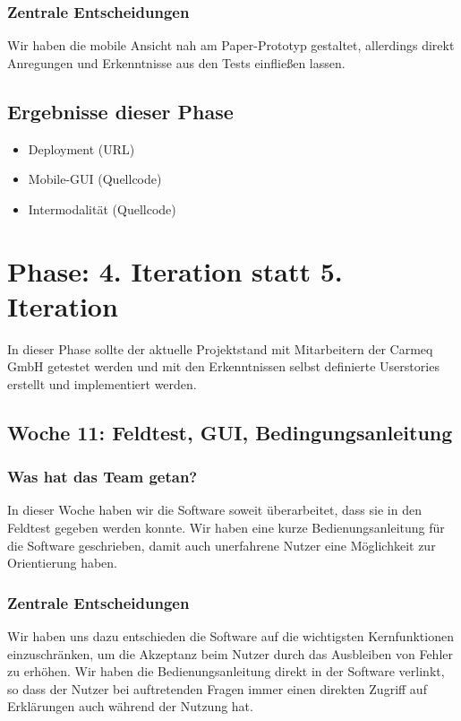 \documentclass{article}
\begin{document}
\subsubsection{Zentrale Entscheidungen}

Wir haben die mobile Ansicht nah am Paper-Prototyp gestaltet, allerdings direkt Anregungen und Erkenntnisse aus den Tests einflie\ss en lassen.

\subsection{Ergebnisse dieser Phase}

\begin{itemize}
\item Deployment (URL)
\item Mobile-GUI (Quellcode)
\item Intermodalit\"at (Quellcode)
\end{itemize}

\section{Phase: 4. Iteration statt 5. Iteration}

In dieser Phase sollte der aktuelle Projektstand mit Mitarbeitern der Carmeq GmbH getestet werden und mit den Erkenntnissen selbst definierte Userstories erstellt und implementiert werden.

\subsection{Woche 11: Feldtest, GUI, Bedingungsanleitung}

\subsubsection{Was hat das Team getan?}

In dieser Woche haben wir die Software soweit \"uberarbeitet, dass sie in den Feldtest gegeben werden konnte. Wir haben eine kurze Bedienungsanleitung f\"ur die Software geschrieben, damit auch unerfahrene Nutzer eine M\"oglichkeit zur Orientierung haben.

\subsubsection{Zentrale Entscheidungen}

Wir haben uns dazu entschieden die Software auf die wichtigsten Kernfunktionen einzuschr\"anken, um die Akzeptanz beim Nutzer durch das Ausbleiben von Fehler zu erh\"ohen. Wir haben die Bedienungsanleitung direkt in der Software verlinkt, so dass der Nutzer bei auftretenden Fragen immer einen direkten Zugriff auf Erkl\"arungen auch w\"ahrend der Nutzung hat.
\end{document}

